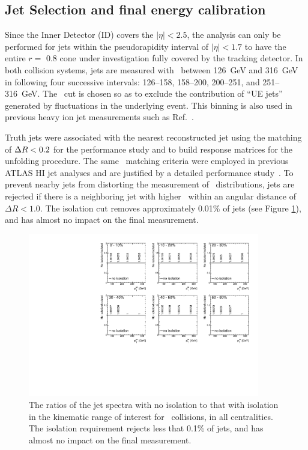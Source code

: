 \subsection{Jet Selection and final energy calibration}
\label{Sec:JetSelection}
Since the Inner Detector (ID) covers the $|\eta| < 2.5$, the analysis can only be performed for jets within the pseudorapidity interval of $|\eta| < 1.7$ to have the entire $ r = $ 0.8 cone under investigation fully covered by the tracking detector.
In both collision systems, jets are measured with \ptjet\ between 126~GeV and 316~GeV in following four successive intervals: 126--158, 158--200, 200--251, and 251--316~GeV.
The \ptjet\ cut is chosen so as to exclude the contribution of ``UE jets'' generated by fluctuations in the underlying event.
This binning is also used in previous heavy ion jet measurements such as Ref.~\cite{PhysRevC.98.024908}.

Truth jets were associated with the nearest reconstructed jet using the matching of $\mbox{$\Delta R$}<0.2$ for the performance study and to build response matrices for the unfolding procedure.
The same \dR\ matching criteria were employed in previous ATLAS HI jet analyses and are justified by a detailed performance study~\cite{ATLAS-COM-PHYS-2011-1733}.
To prevent nearby jets from distorting the measurement of \Dptr\ distributions, jets are rejected if there is a neighboring jet with higher \ptjet\ within an angular distance of $\Delta R < 1.0$.
The isolation cut removes approximately 0.01\% of jets (see Figure \ref{fig:ISO}), and has almost no impact on the final measurement.

\begin{figure}
\centering
\includegraphics[width=0.9\textwidth]{figures/main/performance/jet_iso.pdf}
\caption{The ratios of the jet spectra with no isolation to that with isolation in the kinematic range of interest for \pbpb\ collisions, in all centralities.
The isolation requirement rejects less that 0.1\% of jets, and has almost no impact on the final measurement.
}
\label{fig:ISO}
\end{figure}  

